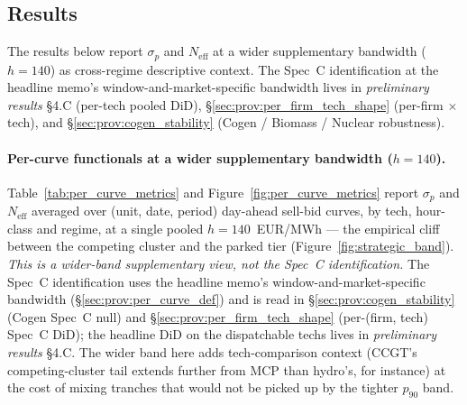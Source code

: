 \documentclass[11pt,a4paper]{article}
\begin{document}
\subsection{Results}\label{sec:prov:dw_tables}

\noindent The results below report $\sigma_p$ and $N_{\text{eff}}$ at a wider supplementary bandwidth ($h = 140$) as cross-regime descriptive context. The Spec~C identification at the headline memo's window-and-market-specific bandwidth lives in \emph{preliminary results} \S 4.C (per-tech pooled DiD), \S\ref{sec:prov:per_firm_tech_shape} (per-firm $\times$ tech), and \S\ref{sec:prov:cogen_stability} (Cogen / Biomass / Nuclear robustness).

\paragraph{Per-curve functionals at a wider supplementary bandwidth ($h = 140$).}
Table~\ref{tab:per_curve_metrics} and Figure~\ref{fig:per_curve_metrics} report $\sigma_p$ and $N_{\text{eff}}$ averaged over (unit, date, period) day-ahead sell-bid curves, by tech, hour-class and regime, at a single pooled $h = 140$~EUR/MWh --- the empirical cliff between the competing cluster and the parked tier (Figure~\ref{fig:strategic_band}). \emph{This is a wider-band supplementary view, not the Spec~C identification.} The Spec~C identification uses the headline memo's window-and-market-specific bandwidth (\S\ref{sec:prov:per_curve_def}) and is read in \S\ref{sec:prov:cogen_stability} (Cogen Spec~C null) and \S\ref{sec:prov:per_firm_tech_shape} (per-(firm, tech) Spec~C DiD); the headline DiD on the dispatchable techs lives in \emph{preliminary results} \S 4.C. The wider band here adds tech-comparison context (CCGT's competing-cluster tail extends further from MCP than hydro's, for instance) at the cost of mixing tranches that would not be picked up by the tighter $p_{90}$ band.

\begin{table}[H]
\centering\footnotesize
\caption{\textbf{Per-curve bid-shape metrics by tech, hour-class and regime (wider-band supplementary, $h = 140$).} DA sell bids, in-band $|p-\text{MCP}|\le 140$~EUR/MWh (the descriptive cliff bandwidth, not the headline memo's $p_{90}-p_{50}$ bandwidth used for Spec~C identification). Mean over (unit, date, period) curves. $\sigma_p$ = MW-weighted price spread (EUR/MWh); $N_{\text{eff}}$ = effective in-band tranche count. $953{,}384$ in-band curves. Cross-regime reading: tech ranking holds, but the absolute magnitudes are inflated relative to the Spec~C bandwidth by the inclusion of the outer tail of the competing cluster.}
\label{tab:per_curve_metrics}
\setlength{\tabcolsep}{4pt}

\end{table}
\end{document}
